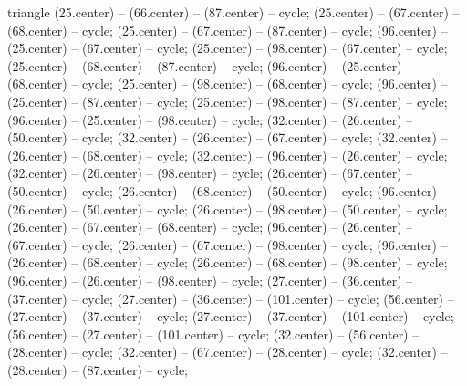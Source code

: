 \begin{pgfonlayer}{triangle}
 (25.center) -- (66.center) -- (87.center) -- cycle; 
 (25.center) -- (67.center) -- (68.center) -- cycle; 
 (25.center) -- (67.center) -- (87.center) -- cycle; 
 (96.center) -- (25.center) -- (67.center) -- cycle; 
 (25.center) -- (98.center) -- (67.center) -- cycle; 
 (25.center) -- (68.center) -- (87.center) -- cycle; 
 (96.center) -- (25.center) -- (68.center) -- cycle; 
 (25.center) -- (98.center) -- (68.center) -- cycle; 
 (96.center) -- (25.center) -- (87.center) -- cycle; 
 (25.center) -- (98.center) -- (87.center) -- cycle; 
 (96.center) -- (25.center) -- (98.center) -- cycle; 
 (32.center) -- (26.center) -- (50.center) -- cycle; 
 (32.center) -- (26.center) -- (67.center) -- cycle; 
 (32.center) -- (26.center) -- (68.center) -- cycle; 
 (32.center) -- (96.center) -- (26.center) -- cycle; 
 (32.center) -- (26.center) -- (98.center) -- cycle; 
 (26.center) -- (67.center) -- (50.center) -- cycle; 
 (26.center) -- (68.center) -- (50.center) -- cycle; 
 (96.center) -- (26.center) -- (50.center) -- cycle; 
 (26.center) -- (98.center) -- (50.center) -- cycle; 
 (26.center) -- (67.center) -- (68.center) -- cycle; 
 (96.center) -- (26.center) -- (67.center) -- cycle; 
 (26.center) -- (67.center) -- (98.center) -- cycle; 
 (96.center) -- (26.center) -- (68.center) -- cycle; 
 (26.center) -- (68.center) -- (98.center) -- cycle; 
 (96.center) -- (26.center) -- (98.center) -- cycle; 
 (27.center) -- (36.center) -- (37.center) -- cycle; 
 (27.center) -- (36.center) -- (101.center) -- cycle; 
 (56.center) -- (27.center) -- (37.center) -- cycle; 
 (27.center) -- (37.center) -- (101.center) -- cycle; 
 (56.center) -- (27.center) -- (101.center) -- cycle; 
 (32.center) -- (56.center) -- (28.center) -- cycle; 
 (32.center) -- (67.center) -- (28.center) -- cycle; 
 (32.center) -- (28.center) -- (87.center) -- cycle; 

\end{pgfonlayer}
